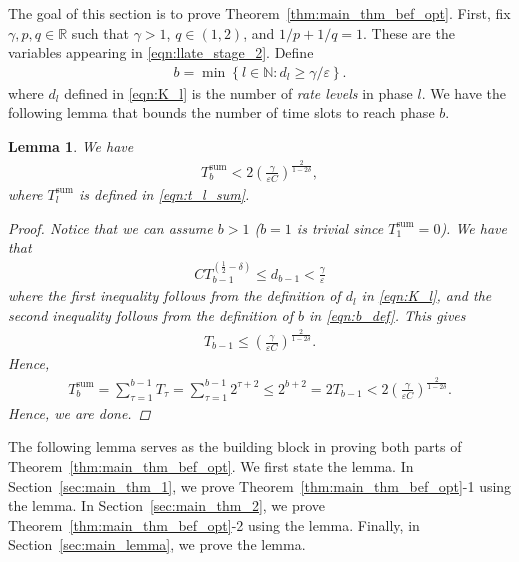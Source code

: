 \documentclass[12pt,draftcls, onecolumn]{IEEEtran}
\newtheorem{lemma}{Lemma}
\begin{document}
The goal of this section is to prove Theorem~\ref{thm:main_thm_bef_opt}. First, fix $\gamma,p,q \in \mathbb{R}$ such that $\gamma > 1$, $q \in (1,2)$, and $1/p+1/q = 1$. These are the variables appearing in \eqref{eqn:llate_stage_2}. Define
\begin{align}\label{eqn:b_def}
    b = \min\left\{l \in \mathbb{N}: d_l \geq \gamma/\varepsilon \right\}.
\end{align}
where $d_l$ defined in \eqref{eqn:K_l} is the number of \emph{rate levels} in phase $l$. We have the following lemma that bounds the number of time slots to reach phase $b$.
\begin{lemma}\label{lemma:to_b}
We have
\begin{align}
    T^{\text{sum}}_b <  2\left(\frac{\gamma}{\varepsilon C}\right)^{\frac{2}{1-2\delta}}, \nonumber
\end{align}
where $T_l^{\text{sum}}$ is defined in \eqref{eqn:t_l_sum}.
\begin{proof}
Notice that we can assume $b>1$ ($b = 1$ is trivial since $T^{\text{sum}}_1 = 0$). 
We have that
\begin{align}
    CT_{b-1}^{\left(\frac{1}{2}-\delta\right)} \leq d_{b-1} < \frac{\gamma}{\varepsilon} \nonumber
\end{align}
where the first inequality follows from the definition of $d_l$ in \eqref{eqn:K_l}, and the second inequality follows from the definition of $b$ in \eqref{eqn:b_def}. This gives
\begin{align}
    T_{b-1} \leq \left(\frac{\gamma}{\varepsilon C}\right)^{\frac{2}{1-2\delta}}. \nonumber
\end{align}
Hence,
\begin{align}
    T^{\text{sum}}_b =  \sum_{\tau = 1}^{b-1}T_{\tau}= \sum_{\tau = 1}^{b-1}2^{\tau+2} \leq 2^{b+2}  = 2T_{b-1} <  2\left(\frac{\gamma}{\varepsilon C}\right)^{\frac{2}{1-2\delta}}. \nonumber
\end{align}
Hence, we are done.
    \end{proof}
\end{lemma}
The following lemma serves as the building block in proving both parts of Theorem~\ref{thm:main_thm_bef_opt}. We first state the lemma. In Section~\ref{sec:main_thm_1}, we prove Theorem~\ref{thm:main_thm_bef_opt}-1 using the lemma. In Section~\ref{sec:main_thm_2}, we prove Theorem~\ref{thm:main_thm_bef_opt}-2 using the lemma. Finally, in Section~\ref{sec:main_lemma}, we prove the lemma.
\end{document}

